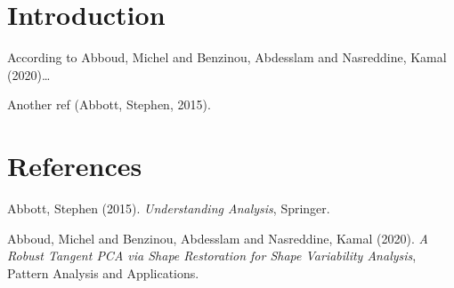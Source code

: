 \documentclass[11pt]{article}
\author{Frédéric Santos}
\date{}
\title{}
\begin{document}
\tableofcontents

\section{Introduction}
\label{sec:orgb620d7d}
According to Abboud, Michel and Benzinou, Abdesslam and Nasreddine, Kamal (2020)\ldots{}

Another ref (Abbott, Stephen, 2015).
\section*{References}
\label{sec:org8b1acf1}
\noindent
Abbott, Stephen (2015). \emph{Understanding Analysis}, Springer.

\noindent
Abboud, Michel and Benzinou, Abdesslam and Nasreddine, Kamal (2020). \emph{A Robust Tangent {{PCA}} via Shape Restoration for Shape Variability Analysis}, Pattern Analysis and Applications.
\end{document}
